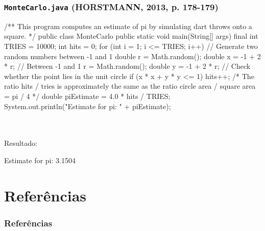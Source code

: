 \documentclass[xcolor={dvipsnames,table},aspectratio=169]{beamer}
\begin{document}
\begin{frame}[fragile]\frametitle{\texttt{MonteCarlo.java} {\tiny (HORSTMANN, 2013, p. 178-179)}}
{\tiny
\begin{javacode}
/**
   This program computes an estimate of pi by simulating dart throws onto a square.
*/
public class MonteCarlo {
   public static void main(String[] args) {
      final int TRIES = 10000;
      int hits = 0;
      for (int i = 1; i <= TRIES; i++) {
         // Generate two random numbers between -1 and 1
         double r = Math.random();
         double x = -1 + 2 * r; // Between -1 and 1
         r = Math.random();
         double y = -1 + 2 * r;
         // Check whether the point lies in the unit circle
         if (x * x + y * y <= 1) { hits++; }
      }
      /* The ratio hits / tries is approximately the same as the ratio
         circle area / square area = pi / 4  */
      double piEstimate = 4.0 * hits / TRIES;
      System.out.println("Estimate for pi: " + piEstimate);
   }
}
\end{javacode}
~\\
~\\
Resultado:\\
\begin{javacode}
Estimate for pi: 3.1504
\end{javacode}
}
\end{frame}

\section{Referências}

\begin{frame}\frametitle{Referências}
\end{frame}

\end{document}
